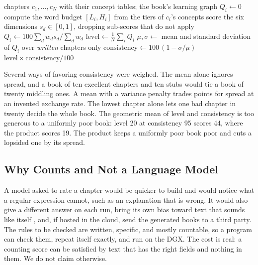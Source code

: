 \documentclass[11pt]{article}
\begin{document}
\begin{algorithm}[htbp]
\caption{Scoring one generated book}
\label{alg:book}
\begin{algorithmic}[1]
\Require chapters $c_1,\dots,c_N$ with their concept tables; the book's learning graph
    \State $Q_i \gets 0$ 
  \Else
    \State compute the word budget $[L_i,H_i]$ from the tiers of $c_i$'s concepts
    \State score the six dimensions $s_d\in[0,1]$, dropping sub-scores that do not apply
    \State $Q_i \gets 100\sum_d w_d s_d \big/ \sum_d w_d$
  \EndIf
\EndFor
\State $\mathrm{level} \gets \frac{1}{N}\sum_{i} Q_i$ 
\State $\mu,\sigma \gets$ mean and standard deviation of $Q_i$ over \emph{written} chapters only
\State $\mathrm{consistency} \gets 100\,(1-\sigma/\mu)$ 
\State \Return $\mathrm{level}\times\mathrm{consistency}/100$
\end{algorithmic}
\end{algorithm}

Several ways of favoring consistency were weighed. The mean alone ignores spread, and a book of ten excellent chapters and ten stubs would tie a book of twenty middling ones. A mean with a variance penalty trades points for spread at an invented exchange rate. The lowest chapter alone lets one bad chapter in twenty decide the whole book. The geometric mean of level and consistency is too generous to a uniformly poor book: level 20 at consistency 95 scores 44, where the product scores 19. The product keeps a uniformly poor book poor and cuts a lopsided one by its spread.

\subsection{Why Counts and Not a Language Model}

A model asked to rate a chapter would be quicker to build and would notice what a regular expression cannot, such as an explanation that is wrong. It would also give a different answer on each run, bring its own bias toward text that sounds like itself \cite{zheng2023judge, panickssery2024selfpref}, and, if hosted in the cloud, send the generated books to a third party. The rules to be checked are written, specific, and mostly countable, so a program can check them, repeat itself exactly, and run on the DGX. The cost is real: a counting score can be satisfied by text that has the right fields and nothing in them. We do not claim otherwise.
\end{document}
